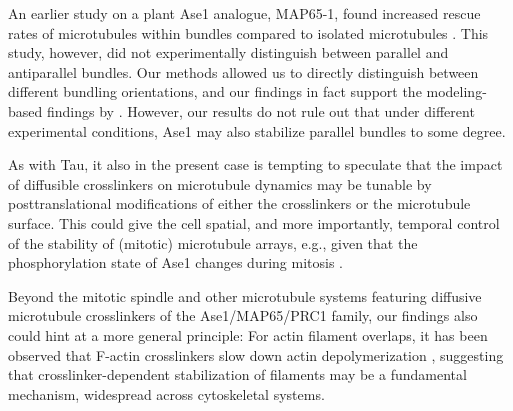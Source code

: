 An earlier study on a plant Ase1 analogue, MAP65-1, found increased rescue rates of microtubules within bundles compared to isolated microtubules \parencite{Stoppin-Mellet2013}. This study, however, did not experimentally distinguish between parallel and antiparallel bundles. Our methods allowed us to directly distinguish between different bundling orientations, and our findings in fact support the modeling-based findings by \parencite{Stoppin-Mellet2013}. However, our results do not rule out that under different experimental conditions, Ase1 may also stabilize parallel bundles to some degree.\par

As with Tau, it also in the present case is tempting to speculate that the impact of diffusible crosslinkers on microtubule dynamics may be tunable by posttranslational modifications of either the crosslinkers or the microtubule surface. This could give the cell spatial, and more importantly, temporal control of the stability of (mitotic) microtubule arrays, e.g., given that the phosphorylation state of Ase1 changes during mitosis . \par

Beyond the mitotic spindle and other microtubule systems featuring diffusive microtubule crosslinkers of the Ase1/MAP65/PRC1 family, our findings also could hint at a more general principle: For actin filament overlaps, it has been observed that F-actin crosslinkers slow down actin depolymerization \parencite{maul2003eplin,schmoller2011slow}, suggesting that crosslinker-dependent stabilization of filaments may be a fundamental mechanism, widespread across cytoskeletal systems.